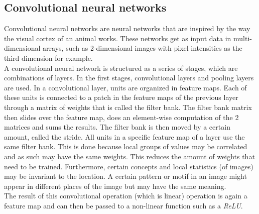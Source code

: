 \documentclass[a4paper, 11pt]{article}
\begin{document}
\subsection{Convolutional neural networks}
Convolutional neural networks are neural networks that are inspired by the way the visual cortex of an animal works. These networks get as input data in multi-dimensional arrays, such as 2-dimensional images with pixel intensities as the third dimension for example.\\
A convolutional neural network is structured as a series of stages, which are combinations of layers. In the first stages, convolutional layers and pooling layers are used.
In a convolutional layer, units are organized in feature maps. Each of these units is connected to a patch in the feature maps of the previous layer through a matrix of weights that is called the filter bank. The filter bank matrix then slides over the feature map, does an element-wise computation of the 2 matrices and sums the results. The filter bank is then moved by a certain amount, called the stride. All units in a specific feature map of a layer use the same filter bank.
This is done because local groups of values may be correlated and as such may have the same weights. This reduces the amount of weights that need to be trained. Furthermore, certain concepts and local statistics (of images) may be invariant to the location. A certain pattern or motif in an image might appear in different places of the image but may have the same meaning.\\
The result of this convolutional operation (which is linear) operation is again a feature map and can then be passed to a non-linear function such as a \textit{ReLU}.\\
\end{document}
